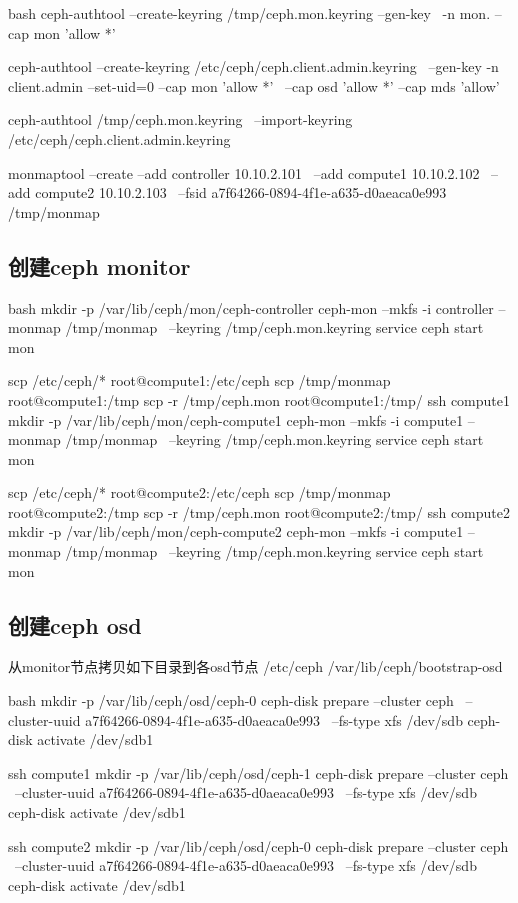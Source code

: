 \begin{code-block}{bash}
ceph-authtool --create-keyring /tmp/ceph.mon.keyring --gen-key \
    -n mon. --cap mon 'allow *'

ceph-authtool --create-keyring /etc/ceph/ceph.client.admin.keyring \
    --gen-key -n client.admin --set-uid=0 --cap mon 'allow *' \
    --cap osd 'allow *' --cap mds 'allow'

ceph-authtool /tmp/ceph.mon.keyring \
    --import-keyring /etc/ceph/ceph.client.admin.keyring

monmaptool --create --add controller 10.10.2.101  \
                    --add compute1 10.10.2.102 \
                    --add compute2 10.10.2.103  \
                    --fsid a7f64266-0894-4f1e-a635-d0aeaca0e993 /tmp/monmap
\end{code-block}

\subsection{创建ceph monitor}
\begin{code-block}{bash}
mkdir -p /var/lib/ceph/mon/ceph-controller
ceph-mon --mkfs -i controller --monmap /tmp/monmap \
    --keyring /tmp/ceph.mon.keyring
service ceph start mon

scp /etc/ceph/* root@compute1:/etc/ceph
scp /tmp/monmap root@compute1:/tmp
scp -r /tmp/ceph.mon root@compute1:/tmp/
ssh compute1
mkdir -p /var/lib/ceph/mon/ceph-compute1
ceph-mon --mkfs -i compute1 --monmap /tmp/monmap \
    --keyring /tmp/ceph.mon.keyring
service ceph start mon

scp /etc/ceph/* root@compute2:/etc/ceph
scp /tmp/monmap root@compute2:/tmp
scp -r /tmp/ceph.mon root@compute2:/tmp/
ssh compute2
mkdir -p /var/lib/ceph/mon/ceph-compute2
ceph-mon --mkfs -i compute1 --monmap /tmp/monmap \
    --keyring /tmp/ceph.mon.keyring
service ceph start mon
\end{code-block}

\subsection{创建ceph osd}
从monitor节点拷贝如下目录到各osd节点
/etc/ceph
/var/lib/ceph/bootstrap-osd

\begin{code-block}{bash}
mkdir -p /var/lib/ceph/osd/ceph-0
ceph-disk prepare --cluster ceph \
    --cluster-uuid a7f64266-0894-4f1e-a635-d0aeaca0e993 \
    --fs-type xfs  /dev/sdb
ceph-disk activate /dev/sdb1
    
ssh compute1
mkdir -p /var/lib/ceph/osd/ceph-1
ceph-disk prepare --cluster ceph \
    --cluster-uuid a7f64266-0894-4f1e-a635-d0aeaca0e993 \
    --fs-type xfs  /dev/sdb
ceph-disk activate /dev/sdb1
    
ssh compute2
mkdir -p /var/lib/ceph/osd/ceph-0
ceph-disk prepare --cluster ceph \
    --cluster-uuid a7f64266-0894-4f1e-a635-d0aeaca0e993 \
    --fs-type xfs  /dev/sdb
ceph-disk activate /dev/sdb1
\end{code-block}

